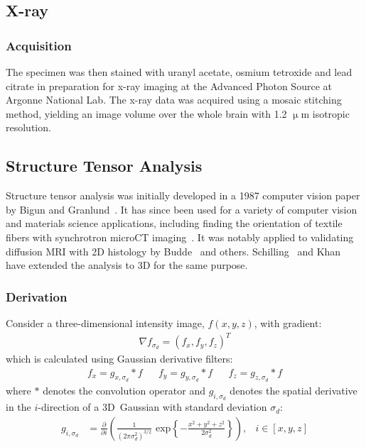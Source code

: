 \documentclass[11pt]{article}
\begin{document}
\subsection{X-ray}
\subsubsection{Acquisition}
The specimen was then stained with uranyl acetate,
osmium tetroxide and lead citrate in preparation for x-ray imaging at the
Advanced Photon Source at Argonne National Lab. The x-ray data was acquired
using a mosaic stitching method, yielding an image volume over the whole brain
with 1.2 $\upmu$m isotropic resolution.


\subsection{Structure Tensor Analysis}
Structure tensor analysis was initially developed in a 1987 computer vision
paper by Bigun and Granlund~\cite{Bigun1987}. It has since been used for a
variety of computer vision and materials science applications, including finding
the orientation of textile fibers with synchrotron microCT
imaging~\cite{Straumit2015}. It was notably applied to validating diffusion MRI
with 2D histology by Budde~\cite{Budde2012,Budde2013} and
others. Schilling~\cite{Schilling2016,Schilling2018} and Khan~\cite{Khan2015}
have extended the analysis to 3D for the same purpose.

\subsubsection{Derivation}

Consider a three-dimensional intensity image, $f(x,y,z)$, with gradient:
\begin{align}
  \label{eq:grad}
  \nabla f_{\sigma_d} = {\left(f_x, f_y, f_z\right)}^T
\end{align}
which is calculated using Gaussian derivative filters:
\begin{align}
  \label{eq:gradcomps}
  f_x = g_{x,\sigma_d} \ast f & &  f_y = g_{y,\sigma_d} \ast f & &  f_z = g_{z,\sigma_d} \ast f
\end{align}
where $\ast$ denotes the convolution operator and $g_{i, \sigma_d}$ denotes the
spatial derivative in the $i$-direction of a 3D~Gaussian with
standard deviation $\sigma_d$:
\begin{align}
  \label{eq:gauss}
  g_{i,\sigma_d} &= \frac{\partial}{\partial i}\left(\frac{1}{\left(2\pi\sigma_d^2\right)^{3/2}}\text{ exp}\left\{-\frac{x^2 + y^2 + z^2}{2\sigma_d^2}\right\}\right), & i \in [x, y, z]
\end{align}
\end{document}
